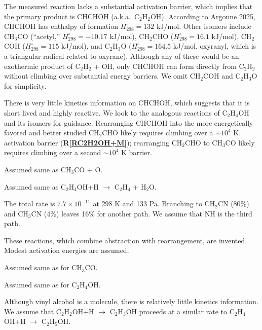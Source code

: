 \documentclass[12pt,landscape]{article}
\newcounter{reaction}
\begin{document}
  The measured reaction lacks a substantial activation  barrier, which implies that the primary product is CHCHOH (a.k.a.\ C$_2$H$_2$OH). 
According to Argonne 2025,  CHCHOH has enthalpy of formation $H^{\circ}_{298}=132$ kJ/mol.
Other isomers include CH$_3$CO (``acetyl,'' $H^{\circ}_{298} = -10.17$ kJ/mol), CH$_2$CHO  ($H^{\circ}_{298} = 16.1$ kJ/mol),
 CH$_2$COH  ($H^{\circ}_{298} = 115$ kJ/mol), and C$_2$H$_3$O ($H^{\circ}_{298} = 164.5$ kJ/mol, oxyranyl, which is a triangular radical related to oxyrane). 
 Although any of these would be an exothermic product of C$_2$H$_2$ + OH, only CHCHOH can form directly from C$_2$H$_2$ without climbing over substantial energy barriers.
 We omit CH$_2$COH and C$_2$H$_3$O for simplicity.

  There is very little kinetics information on CHCHOH, which suggests that it is short lived and highly reactive.
We look to the analogous reactions of C$_2$H$_4$OH and its isomers for guidance.
Rearranging CHCHOH into the more energetically favored and better studied CH$_2$CHO likely requires climbing over a $\sim\! 10^4$ K.
 activation barrier ({\bf R\ref{RC2H2OH+M}}); rearranging CH$_2$CHO to CH$_3$CO likely requires climbing over a second $\sim\! 10^4$ K barrier.   

  Assumed same as CH$_3$CO + O.

 Assumed same as C$_2$H$_4$OH+H $\rightarrow$ C$_2$H$_4$ + H$_2$O.

  The total rate is $7.7\times 10^{-11}$ at 298 K and 133 Pa.  Branching to CH$_2$CN (80\%) and CH$_3$CN (4\%) leaves 16\% for another path.  We assume that NH is the third path. 


  These reactions, which combine abstraction with rearrangement, are invented. 
Modest activation energies are assumed.

  Assumed same as for CH$_3$CO.

  Assumed same as for C$_2$H$_4$OH.

  Although vinyl alcohol is a molecule, there is relatively little kinetics information. 
We assume that C$_2$H$_2$OH+H $\rightarrow$ C$_2$H$_3$OH proceeds at a similar rate to C$_2$H$_4$OH+H $\rightarrow$ C$_2$H$_5$OH.
\end{document}
